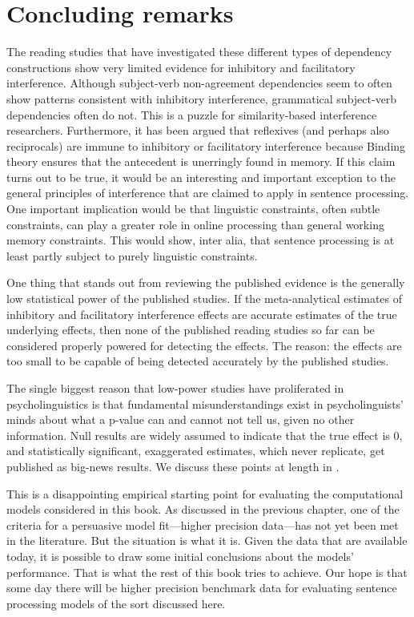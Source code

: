 \documentclass{cambridge7A}\usepackage[]{graphicx}\usepackage[]{color}
\begin{document}
\section{Concluding remarks}

The reading studies that have investigated these different types of dependency constructions show very limited evidence for inhibitory and facilitatory interference. Although subject-verb non-agreement dependencies seem to often show patterns consistent with inhibitory interference, grammatical subject-verb dependencies often do not. This is a puzzle for similarity-based interference researchers. Furthermore, it has been argued that reflexives (and perhaps also reciprocals) are immune to inhibitory or facilitatory interference because Binding theory ensures that the antecedent is unerringly found in memory. If this claim turns out to be true, it would be an interesting and important exception to the general principles of interference that are claimed to apply in sentence processing. One important implication would be that linguistic constraints, often subtle constraints, can play a greater role in online processing than general working memory constraints. This would show, inter alia, that sentence processing is at least partly subject to purely linguistic constraints.


One thing that stands out from reviewing the published evidence \citep{JaegerEngelmannVasishth2017} is the generally low statistical power of the published studies. If the meta-analytical estimates of inhibitory and facilitatory interference effects are accurate estimates of the true underlying effects, then none of the published reading studies so far can be considered properly powered for detecting the effects. The reason: the effects are too small to be capable of being detected accurately by the published studies.  

The single biggest reason that low-power studies have proliferated in psycholinguistics is that fundamental misunderstandings exist in psycholinguists' minds about what a p-value can and cannot not tell us, given no other information. Null results are widely assumed to indicate that the true effect is 0, and statistically significant, exaggerated estimates, which never replicate, get published as big-news results. We discuss these points at length in \cite{VasishthMertzenJaegerGelman2018,nicenboimexploratory,JaegerMertzenVanDykeVasishth2019,NicenboimPreactivation2019}.
 
This is a disappointing empirical starting point for evaluating the computational models considered in this book. As discussed in the previous chapter, one of the \cite{rp} criteria for a persuasive model fit---higher precision  data---has not yet been met in the literature. But the situation is what it is. Given the data that are available today, it is possible to draw some initial conclusions  about the models' performance. That is what the rest of this book tries to achieve. Our hope is that some day there will be higher precision benchmark data for evaluating sentence processing models of the sort discussed here.      
\end{document}
